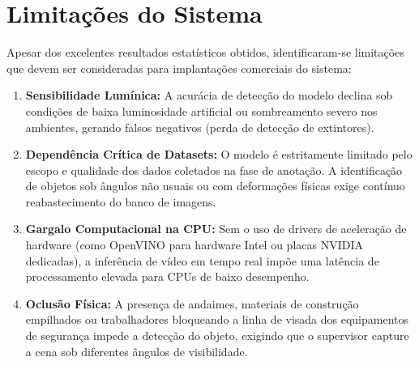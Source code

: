 \section{Limitações do Sistema}
Apesar dos excelentes resultados estatísticos obtidos, identificaram-se limitações que devem ser consideradas para implantações comerciais do sistema:
\begin{enumerate}
    \item \textbf{Sensibilidade Lumínica:} A acurácia de detecção do modelo declina sob condições de baixa luminosidade artificial ou sombreamento severo nos ambientes, gerando falsos negativos (perda de detecção de extintores).
    \item \textbf{Dependência Crítica de Datasets:} O modelo é estritamente limitado pelo escopo e qualidade dos dados coletados na fase de anotação. A identificação de objetos sob ângulos não usuais ou com deformações físicas exige contínuo reabastecimento do banco de imagens.
    \item \textbf{Gargalo Computacional na CPU:} Sem o uso de drivers de aceleração de hardware (como OpenVINO para hardware Intel ou placas NVIDIA dedicadas), a inferência de vídeo em tempo real impõe uma latência de processamento elevada para CPUs de baixo desempenho.
    \item \textbf{Oclusão Física:} A presença de andaimes, materiais de construção empilhados ou trabalhadores bloqueando a linha de visada dos equipamentos de segurança impede a detecção do objeto, exigindo que o supervisor capture a cena sob diferentes ângulos de visibilidade.
\end{enumerate}

